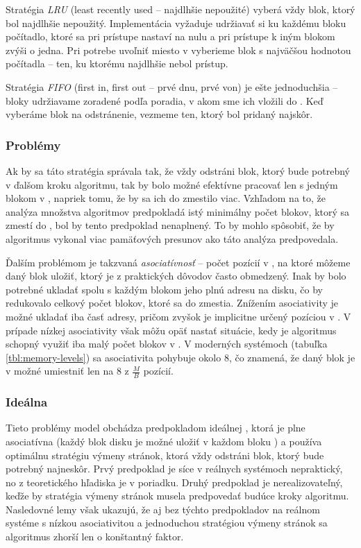 Stratégia \emph{LRU} (least recently used -- najdlhšie nepoužité) vyberá vždy blok, ktorý bol najdlhšie nepoužitý. Implementácia vyžaduje udržiavať si ku každému bloku počítadlo, ktoré sa pri prístupe nastaví na nulu a pri prístupe k iným blokom zvýši o jedna. Pri potrebe uvoľniť miesto v \cache vyberieme blok s najväčšou hodnotou počítadla -- ten, ku ktorému najdlhšie nebol prístup.

Stratégia \emph{FIFO} (first in, first out -- prvé dnu, prvé von) je ešte jednoduchšia -- bloky udržiavame zoradené podľa poradia, v akom sme ich vložili do \cache. Keď vyberáme blok na odstránenie, vezmeme ten, ktorý bol pridaný najskôr.

\subsubsection{Problémy}

Ak by sa táto stratégia správala tak, že vždy odstráni blok, ktorý bude potrebný v ďalšom kroku algoritmu, tak by bolo možné efektívne pracovať len s jedným blokom v \cache, napriek tomu, že by sa ich do \cache zmestilo viac. Vzhľadom na to, že analýza množstva \obliv algoritmov predpokladá istý minimálny počet blokov, ktorý sa zmestí do \cache, bol by tento predpoklad nenaplnený. To by mohlo spôsobiť, že by algoritmus vykonal viac pamäťových presunov ako táto analýza predpovedala.

Ďalším problémom je takzvaná \emph{asociatívnosť} \cache -- počet pozícií v \cache, na ktoré môžeme daný blok uložiť, ktorý je z praktických dôvodov často obmedzený. Inak by bolo potrebné ukladať spolu s každým blokom jeho plnú adresu na disku, čo by redukovalo celkový počet blokov, ktoré sa do \cache zmestia. Znížením asociativity je možné ukladať iba časť adresy, pričom zvyšok je implicitne určený pozíciou v \cache. V prípade nízkej asociativity však môžu opäť nastať situácie, kedy je algoritmus schopný využiť iba malý počet blokov v \cache. V moderných systémoch (tabuľka \ref{tbl:memory-levels}) sa asociativita pohybuje okolo $8$, čo znamená, že daný blok je v \cache možné umiestniť len na $8$ z $\frac{M}{B}$ pozícií.

\subsubsection{Ideálna \cache}

Tieto problémy \obliv model obchádza predpokladom ideálnej \cache, ktorá je plne asociatívna (každý blok disku je možné uložiť v každom bloku \cache) a používa optimálnu stratégiu výmeny stránok, ktorá vždy odstráni blok, ktorý bude potrebný najneskôr. Prvý predpoklad je síce v reálnych systémoch nepraktický, no z teoretického hľadiska je v poriadku. Druhý predpoklad je nerealizovateľný, keďže by stratégia výmeny stránok musela predpovedať budúce kroky algoritmu. Nasledovné lemy však ukazujú, že aj bez týchto predpokladov na reálnom systéme s nízkou asociativitou a jednoduchou stratégiou výmeny stránok sa algoritmus zhorší len o konštantný faktor.

